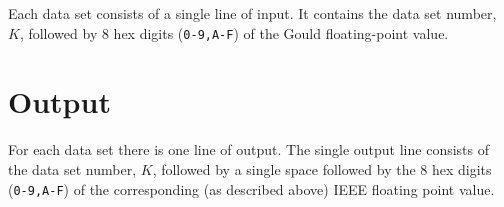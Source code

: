 Each data set consists of a single line of input.  It contains the
data set number, $K$, followed by 8 hex digits (\texttt{0-9,A-F}) of the Gould
floating-point value.


\section*{Output}

For each data set there is one line of output.  The single output line
consists of the data set number, $K$, followed by a single space followed
by the 8 hex digits (\texttt{0-9,A-F}) of the corresponding (as described above)
IEEE floating point value.


